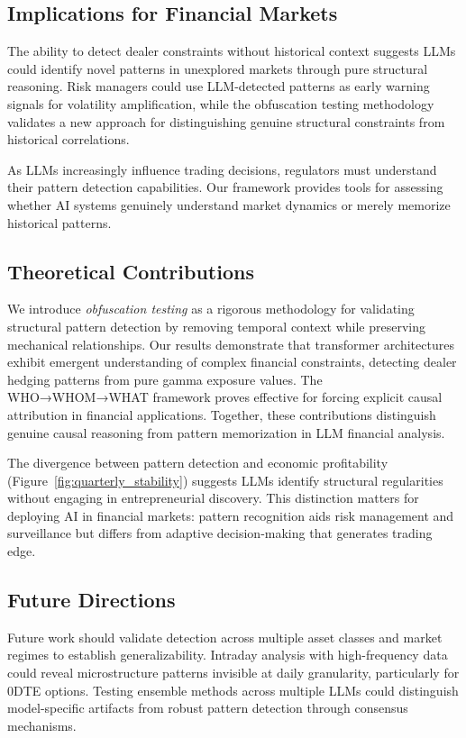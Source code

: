 \subsection{Implications for Financial Markets}
The ability to detect dealer constraints without historical context suggests LLMs could identify novel patterns in unexplored markets through pure structural reasoning. Risk managers could use LLM-detected patterns as early warning signals for volatility amplification, while the obfuscation testing methodology validates a new approach for distinguishing genuine structural constraints from historical correlations.

As LLMs increasingly influence trading decisions, regulators must understand their pattern detection capabilities. Our framework provides tools for assessing whether AI systems genuinely understand market dynamics or merely memorize historical patterns.

\subsection{Theoretical Contributions}

We introduce \textit{obfuscation testing} as a rigorous methodology for validating structural pattern detection by removing temporal context while preserving mechanical relationships. Our results demonstrate that transformer architectures exhibit emergent understanding of complex financial constraints, detecting dealer hedging patterns from pure gamma exposure values. The WHO→WHOM→WHAT framework proves effective for forcing explicit causal attribution in financial applications. Together, these contributions distinguish genuine causal reasoning from pattern memorization in LLM financial analysis.

The divergence between pattern detection and economic profitability (Figure~\ref{fig:quarterly_stability}) suggests LLMs identify structural regularities without engaging in entrepreneurial discovery. This distinction matters for deploying AI in financial markets: pattern recognition aids risk management and surveillance but differs from adaptive decision-making that generates trading edge.

\subsection{Future Directions}
Future work should validate detection across multiple asset classes and market regimes to establish generalizability. Intraday analysis with high-frequency data could reveal microstructure patterns invisible at daily granularity, particularly for 0DTE options. Testing ensemble methods across multiple LLMs could distinguish model-specific artifacts from robust pattern detection through consensus mechanisms.